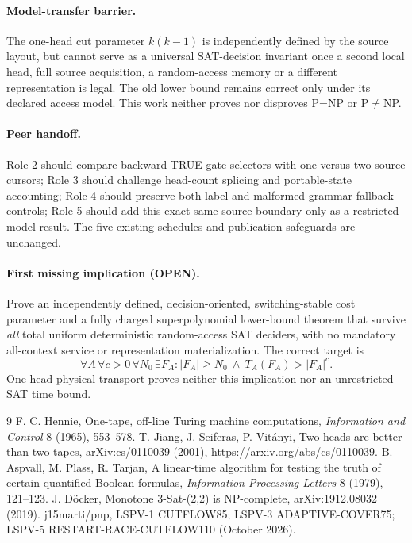 \documentclass[11pt]{article}
\begin{document}
\paragraph{Model-transfer barrier.} The one-head cut parameter $k(k-1)$ is independently defined by the source layout, but cannot serve as a universal SAT-decision invariant once a second local head, full source acquisition, a random-access memory or a different representation is legal. The old lower bound remains correct only under its declared access model. This work neither proves nor disproves P=NP or P$\ne$NP.

\paragraph{Peer handoff.} Role 2 should compare backward TRUE-gate selectors with one versus two source cursors; Role 3 should challenge head-count splicing and portable-state accounting; Role 4 should preserve both-label and malformed-grammar fallback controls; Role 5 should add this exact same-source boundary only as a restricted model result. The five existing schedules and publication safeguards are unchanged.

\paragraph{First missing implication (OPEN).} Prove an independently defined, decision-oriented, switching-stable cost parameter and a fully charged superpolynomial lower-bound theorem that survive \emph{all} total uniform deterministic random-access SAT deciders, with no mandatory all-context service or representation materialization. The correct target is
\[
\forall A\,\forall c>0\,\forall N_0\,\exists F_A:
|F_A|\ge N_0\ \wedge\ T_A(F_A)>|F_A|^c.
\]
One-head physical transport proves neither this implication nor an unrestricted SAT time bound.

\begin{thebibliography}{9}
 F. C. Hennie, One-tape, off-line Turing machine computations, \emph{Information and Control} 8 (1965), 553--578.
 T. Jiang, J. Seiferas, P. Vit\'anyi, Two heads are better than two tapes, arXiv:cs/0110039 (2001), \url{https://arxiv.org/abs/cs/0110039}.
 B. Aspvall, M. Plass, R. Tarjan, A linear-time algorithm for testing the truth of certain quantified Boolean formulas, \emph{Information Processing Letters} 8 (1979), 121--123.
 J. D\"ocker, Monotone 3-Sat-(2,2) is NP-complete, arXiv:1912.08032 (2019).
 j15marti/pnp, LSPV-1 CUTFLOW85; LSPV-3 ADAPTIVE-COVER75; LSPV-5 RESTART-RACE-CUTFLOW110 (October 2026).
\end{thebibliography}
\end{document}
